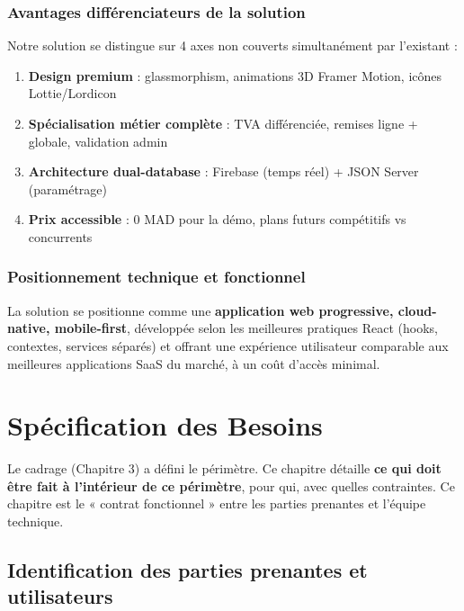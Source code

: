 \documentclass[12pt,a4paper]{report}
\begin{document}
\subsection{Avantages différenciateurs de la solution}

Notre solution se distingue sur 4 axes non couverts simultanément par l'existant :
\begin{enumerate}
    \item \textbf{Design premium} : glassmorphism, animations 3D Framer Motion, icônes Lottie/Lordicon
    \item \textbf{Spécialisation métier complète} : TVA différenciée, remises ligne + globale, validation admin
    \item \textbf{Architecture dual-database} : Firebase (temps réel) + JSON Server (paramétrage)
    \item \textbf{Prix accessible} : 0 MAD pour la démo, plans futurs compétitifs vs concurrents
\end{enumerate}

\subsection{Positionnement technique et fonctionnel}

La solution se positionne comme une \textbf{application web progressive, cloud-native, mobile-first}, développée selon les meilleures pratiques React (hooks, contextes, services séparés) et offrant une expérience utilisateur comparable aux meilleures applications SaaS du marché, à un coût d'accès minimal.

\chapter{Spécification des Besoins}

Le cadrage (Chapitre 3) a défini le périmètre. Ce chapitre détaille \textbf{ce qui doit être fait à l'intérieur de ce périmètre}, pour qui, avec quelles contraintes. Ce chapitre est le « contrat fonctionnel » entre les parties prenantes et l'équipe technique.

\section{Identification des parties prenantes et utilisateurs}
\end{document}
